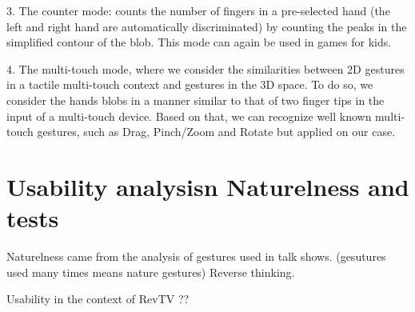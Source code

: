 \documentclass{llncs}
\begin{document}
3. The counter mode: counts the number of fingers in a pre-selected hand (the left and right hand are automatically discriminated) by counting the peaks in the simplified contour of the blob. This mode can again be used in games for kids.

4. The multi-touch mode, where we consider the similarities between 2D gestures in a tactile multi-touch context and gestures in the 3D space. To do so, we consider the hands blobs in a manner similar to that of two finger tips in the input of a multi-touch device. Based on that, we can recognize well known multi-touch gestures, such as Drag, Pinch/Zoom and Rotate but applied on our case.


\section{Usability analysisn Naturelness and tests}

Naturelness came from the analysis of gestures used in talk shows.
(gesutures used many times means nature gestures)
Reverse thinking.

Usability in the context of RevTV ??



\end{document}
